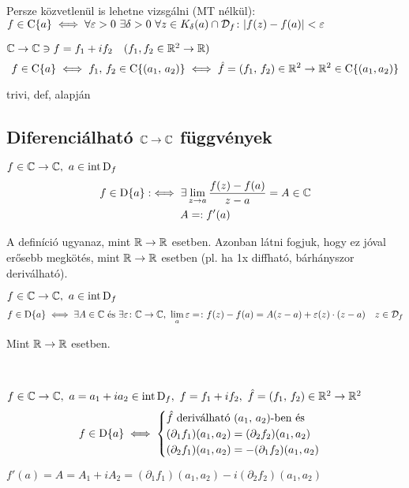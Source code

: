 Persze közvetlenül is lehetne vizsgálni (MT nélkül):\\ 
$f\in\folyt{a} \iff \forall \epsilon > 0\ \exists \delta>0\ \forall
z\in K_\delta(a)\cap \ERTT_f\colon |f(z)-f(a)| < \epsilon$

\begin{te}
  $\mathbb{C}\to\mathbb{C} \owns f=f_1 + if_2\quad (f_1,f_2\in \mathbb{R}^2\to\mathbb{R})$\\
  \[f\in\operatorname{C}\{a\}\iff f_1,\,f_2\in\operatorname{C}\{(a_1,\,a_2)\} \iff \hat{f}=(f_1,\,f_2)\in\mathbb{R}^2\to\mathbb{R}^2 \in\operatorname{C}\{(a_1,a_2)\}\]
\end{te}
\begin{biz}trivi, def, alapján
\end{biz}

\subsection{Diferenciálható $\mathbb{C}\to\mathbb{C}$ függvények}
\begin{de}[deriválhatóság] $f\in\mathbb{C}\to\mathbb{C},\ a\in\operatorname{int\,D}_f$
  \begin{gather*}
    f\in\operatorname{D}\{a\} :\iff \exists \displaystyle\lim_{z\to a}\dfrac{f(z)-f(a)}{z-a} = A \in \mathbb{C}\\
    A =: f'(a)
  \end{gather*}  
\end{de}
\begin{megj} A definíció ugyanaz, mint $\mathbb{R}\to\mathbb{R}$ esetben. Azonban látni fogjuk, hogy ez jóval erősebb megkötés, mint
    $\mathbb{R}\to\mathbb{R}$ esetben (pl. ha 1x diffható, bárhányszor deriválható).
\end{megj}

\begin{te} $f\in \mathbb{C}\to\mathbb{C},\ a\in\operatorname{int\,D}_f$
  \[ f\in\operatorname{D}\{a\} \iff \exists A \in \mathbb{C} \text{ és }\exists \varepsilon\colon\mathbb{C}\to \mathbb{C},\ \displaystyle\lim_a\varepsilon = \colon
  f(z)-f(a)=A(z-a) + \varepsilon(z)\cdot(z-a)\quad z\in\mathcal{D}_f\]
\end{te}
\begin{biz}
  Mint $\mathbb{R}\to\mathbb{R}$ esetben.
\end{biz}
\begin{te}\ \\
  \begin{enumzjb} 
    \item $f\in\C\to\C,\ a=a_1+ia_2\in\intD_f,\ f=f_1+if_2,\ \hat{f}=(f_1,\,f_2)\in\R^2\to\R^2$
      \begin{gather*}
	f\in\operatorname{D}\{a\}\iff \begin{cases}
	  \hat{f} \text{ deriválható }(a_1,\,a_2)\text{-ben és}\\
	  (\partial_1f_1)(a_1,a_2) = (\partial_2f_2)(a_1,a_2)\\
	  (\partial_2f_1)(a_1,a_2) = -(\partial_1f_2)(a_1,a_2)
	\end{cases}
      \end{gather*}
    \item $f'(a) = A = A_1+iA_2 = (\partial_1f_1)(a_1,a_2) - i(\partial_2f_2)(a_1,a_2)$
  \end{enumzjb}
\end{te}

